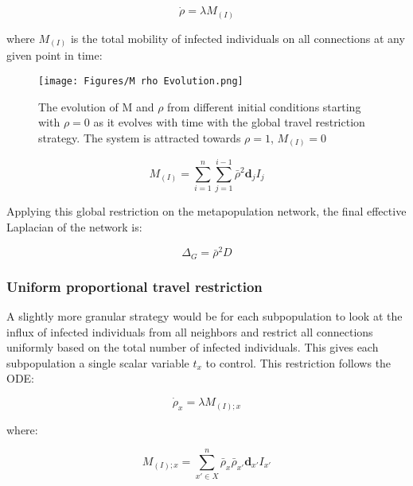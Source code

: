 \begin{equation}
    \dot{\rho} = \lambda M_{(I)}
\end{equation}

where $M_{(I)}$ is the total mobility of infected individuals on all connections at any given point in time:
\begin{figure}
    \centering
    \texttt{[image: Figures/M rho Evolution.png]}
    \caption{\small The evolution of M and $\rho$ from different initial conditions starting with $\rho=0$ as it evolves with time with the global travel restriction strategy. The system is attracted towards $\rho=1$, $M_{(I)}=0$}
    \label{fig: M rho unbiased}
\end{figure}
\begin{equation}
M_{(I)} = \sum_{i=1}^{n} \sum_{j=1}^{i-1} \bar{\rho}^2 \mathbf{d}_{j} I_{j}
\end{equation}

Applying this global restriction on the metapopulation network, the final effective Laplacian of the network is:

\begin{equation}
\Delta_G = \bar{\rho}^2 D
\end{equation}

\subsubsection{Uniform proportional travel restriction}

A slightly more granular strategy would be for each subpopulation to look at the influx of infected individuals from all neighbors and restrict all connections uniformly based on the total number of infected individuals. This gives each subpopulation a single scalar variable $t_x$ to control. This restriction follows the ODE:

\begin{equation}
\dot{\rho}_x = \lambda M_{(I);x}
\end{equation}

where:

\begin{equation}
M_{(I);x} = \sum_{x' \in X}^{n} \bar{\rho}_x \bar{\rho}_{x'} \mathbf{d}_{x'} I_{x'}
\end{equation}

